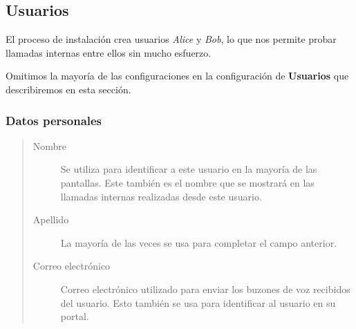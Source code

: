 \documentclass[letterpaper,10pt,spanish]{sphinxmanual}
\begin{document}
\subsection{Usuarios}
\label{administration_portal/client/vpbx/users::doc}\label{administration_portal/client/vpbx/users:users}\label{administration_portal/client/vpbx/users:id1}
El proceso de instalación crea usuarios \emph{Alice} y \emph{Bob}, lo que nos permite probar llamadas internas entre ellos sin mucho esfuerzo.

Omitimos la mayoría de las configuraciones en la configuración de \textbf{Usuarios} que describiremos en esta sección.


\subsubsection{Datos personales}
\label{administration_portal/client/vpbx/users:personal-data}\begin{quote}
\begin{description}
\item[{Nombre}] \leavevmode
Se utiliza para identificar a este usuario en la mayoría de las pantallas. Este también es el nombre que se mostrará en las llamadas internas realizadas desde este usuario.

\item[{Apellido}] \leavevmode
La mayoría de las veces se usa para completar el campo anterior.

\item[{Correo electrónico}] \leavevmode
Correo electrónico utilizado para enviar los buzones de voz recibidos del usuario. Esto también se usa para identificar al usuario en su portal.

\end{description}
\end{quote}
\end{document}
